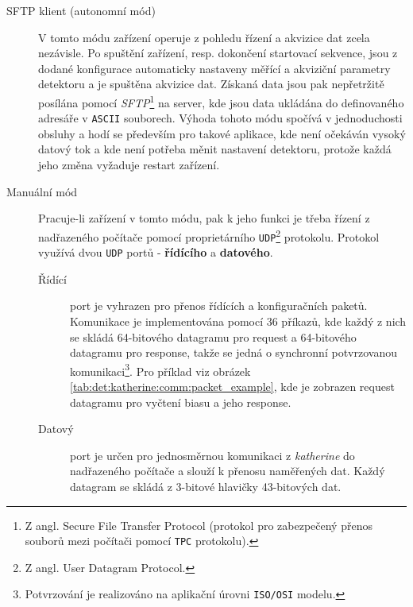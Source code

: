 \begin{description}
	\item [SFTP klient (autonomní mód)] V tomto módu zařízení operuje z pohledu řízení a akvizice dat zcela nezávisle. Po spuštění zařízení, resp. dokončení startovací sekvence, jsou z dodané konfigurace automaticky nastaveny měřící a akviziční parametry detektoru a je spuštěna akvizice dat. Získaná data jsou pak nepřetržitě posílána pomocí \textit{SFTP}\footnote{Z angl. Secure File Transfer Protocol (protokol pro zabezpečený přenos souborů mezi počítači pomocí \texttt{TPC} protokolu).} na server, kde jsou data ukládána do definovaného adresáře v \texttt{ASCII} souborech. Výhoda tohoto módu spočívá v jednoduchosti obsluhy a hodí se především pro takové aplikace, kde není očekáván vysoký datový tok a kde není potřeba měnit nastavení detektoru, protože každá jeho změna vyžaduje restart zařízení.
	
	\item [Manuální mód] Pracuje-li zařízení v tomto módu, pak k jeho funkci je třeba řízení z nadřazeného počítače pomocí proprietárního \texttt{UDP}\footnote{Z angl. User Datagram Protocol.} protokolu. Protokol využívá dvou \texttt{UDP} portů - \textbf{řídícího} a \textbf{datového}.

	\begin{description}
		\item [Řídící] port je vyhrazen pro přenos řídících a konfiguračních paketů. Komunikace je implementována pomocí $36$ příkazů, kde každý z nich se skládá 64-bitového datagramu pro request a 64-bitového datagramu pro response, takže se jedná o synchronní potvrzovanou komunikaci\footnote{Potvrzování je realizováno na aplikační úrovni \texttt{ISO/OSI} modelu.}. Pro příklad viz obrázek \ref{tab:det:katherine:comm:packet_example}, kde je zobrazen request datagramu pro vyčtení biasu a jeho response.
		
		\item [Datový] port je určen pro jednosměrnou komunikaci z \textit{katherine} do nadřazeného počítače a slouží k přenosu naměřených dat. Každý datagram se skládá z 3-bitové hlavičky 43-bitových dat.
	\end{description}
	
\end{description}

